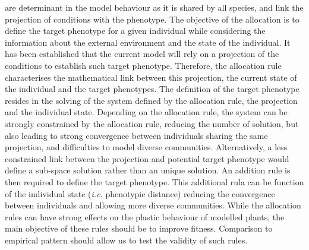  are determinant in the model behaviour as it is shared by all species, and link the projection of conditions with the phenotype. The objective of the allocation is to define the target phenotype for a given individual while considering the information about the external environment and the state of the individual. It has been established that the current model will rely on a projection of the conditions to establish such target phenotype. Therefore, the allocation rule characterises the mathematical link between this projection, the current state of the individual and the target phenotypes. The definition of the target phenotype resides in the solving of the system defined by the allocation rule, the projection and the individual state. Depending on the allocation rule, the system can be strongly constrained by the allocation rule, reducing the number of solution, but also leading to strong convergence between individuals sharing the same projection, and difficulties to model diverse communities. Alternatively, a less constrained link between the projection and potential target phenotype would define a sub-space solution rather than an unique solution. An addition rule is then required to define the target phenotype. This additional rula can be function of the individual state (\textit{i.e.} phenotypic distance) reducing the convergence between individuals and allowing more diverse communities. While the allocation rules can have strong effects on the plastic behaviour of modelled plants, the main objective of these rules should be to improve fitness. Comparison to empirical pattern should allow us to test the validity of such rules.


